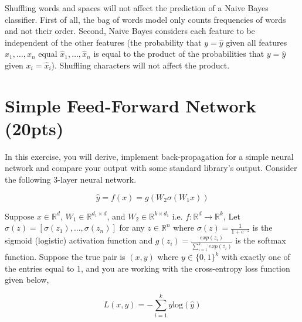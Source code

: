 \documentclass[a4paper]{article}
\theoremstyle{definition}
\newenvironment{soln}{
    \leavevmode\color{blue}\ignorespaces
}{}
\begin{document}
\begin{enumerate}
\begin{soln}
    Shuffling words and spaces will not affect the prediction of a Naive Bayes classifier. First of all, the bag of words model only counts frequencies of words and not their order. Second, Naive Bayes considers each feature to be independent of the other features (the probability that $y=\hat{y}$ given all features $x_1,\dots,x_n$ equal $\hat{x}_1,\dots,\hat{x}_n$ is equal to the product of the probabilities that $y=\hat{y}$ given $x_i=\hat{x}_i$). Shuffling characters will not affect the product.
\end{soln}

\end{enumerate}

\section{Simple Feed-Forward Network (20pts)}
In this exercise, you will derive, implement back-propagation for a simple neural network and compare your output with some standard library’s output. Consider the following 3-layer neural network.

\[
\hat{y} = f(x) = g(W_2\sigma(W_1x))
\]

Suppose $x \in \mathbb{R}^d$, $W_1 \in \mathbb{R}^{d_1 \times d}$, and $W_2 \in \mathbb{R}^{k \times d_1}$ i.e. $f: \mathbb{R}^d \rightarrow \mathbb{R}^k$, Let $\sigma(z) = [\sigma(z_1), ..., \sigma(z_n)]$ for any $z \in \mathbb{R}^n$ where $\sigma(z) = \frac{1}{1 + e^{-z}}$ is the sigmoid (logistic) activation function and $g(z_i) = \frac{exp(z_i)}{\sum_{i=1}^k exp(z_i)}$ is the softmax function. Suppose the true pair is $(x, y)$ where $y \in \{0, 1\}^k$ with exactly one of the entries equal to 1, and you are working with the cross-entropy loss function given below,

\[
L(x, y) = -\sum_{i=1}^k y \text{log}(\hat{y})
\]
\end{document}
